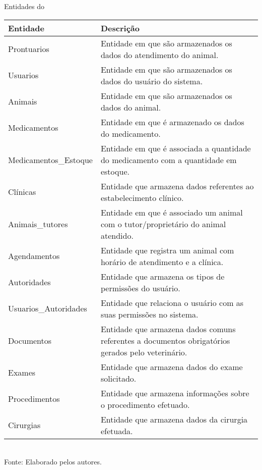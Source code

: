 \documentclass[
    12pt,               %
    openright,          %
    oneside,
    a4paper,            %
    BIBLATEX,           %
    TODO,               %
    english,            %
    brazil              %
    ]{ifsp-spo-inf-ctds}
\begin{document}
            \begin{center}
                \begin{quadro}[H]
                \centering
                \caption{Entidades do  }
                \begin{tabulary}{1.0\textwidth}{|p{10em}|p{26em}|}
                \hline
                Entidade & Descrição\\
                \hline
                Prontuarios & Entidade em que são armazenados os dados do atendimento do animal. \\
                \hline
                Usuarios & Entidade em que são armazenados os dados do usuário do sistema.\\
                \hline
                Animais & Entidade em que são armazenados os dados do animal.\\
                \hline
                Medicamentos & Entidade em que é armazenado os dados do medicamento.\\
                \hline
                Medicamentos\_Estoque & Entidade em que é associada a quantidade do medicamento com a quantidade em estoque.\\
                \hline
                Clínicas & Entidade que armazena dados referentes ao estabelecimento clínico.\\
                \hline
                Animais\_tutores & Entidade em que é associado um animal com o tutor/proprietário do animal atendido.\\
                \hline
                Agendamentos & Entidade que registra um animal com horário de atendimento e a clínica.\\
                \hline
                Autoridades & Entidade que armazena os tipos de permissões do usuário.\\
                \hline
                Usuarios\_Autoridades & Entidade que relaciona o usuário com as suas permissões no sistema.\\
                \hline
                Documentos & Entidade que armazena dados comuns referentes a documentos obrigatórios gerados pelo veterinário.\\
                \hline
                Exames & Entidade que armazena dados do exame solicitado.\\
                \hline
                Procedimentos & Entidade que armazena informações sobre o procedimento efetuado.\\
                \hline
                Cirurgias & Entidade que armazena dados da cirurgia efetuada.\\
                \hline
                \end{tabulary}
                \label{tab: entidades} \\
                \centering
                {\footnotesize Fonte: Elaborado pelos autores.}
                \end{quadro}
            \end{center}  
\end{document}
